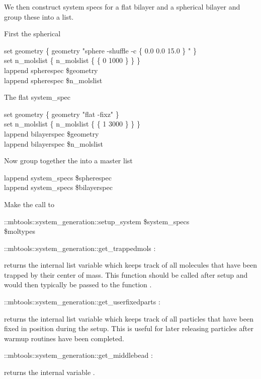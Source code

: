 We then construct system specs for a flat bilayer and a spherical bilayer and group these into a  list.

First the spherical 

\begin{code}      	   
  set geometry \{ geometry  "sphere -shuffle -c \{ 0.0 0.0 15.0 \} " \}\\
  set n_molslist \{ n_molslist \{  \{ 0 1000 \} \} \}\\
  lappend spherespec \$geometry \\
  lappend spherespec \$n_molslist\\
\end{code}      	  

The flat system_spec

\begin{code}     	  
  set geometry \{ geometry "flat -fixz" \}\\
  set n_molslist \{ n_molslist \{  \{ 1 3000 \} \} \}\\
  lappend bilayerspec \$geometry\\
  lappend bilayerspec \$n_molslist\\
\end{code}      	  
      	

Now group together the  into a master list

\begin{code}      	  
  lappend system_specs \$spherespec\\
  lappend system_specs \$bilayerspec\\
\end{code}   	  


Make the call to 

\begin{code}
  ::mbtools::system_generation::setup_system \$system_specs\\
           [setmd box_l] \$moltypes
\end{code}


\begin{code}
  ::mbtools::system_generation::get_trappedmols : 
\end{code}
returns the internal list variable  which keeps track of all molecules that have been trapped by their center of mass. This function should be called after setup and would then typically be passed to the function .
\begin{code}
  ::mbtools::system_generation::get_userfixedparts : 
\end{code}
returns the internal list variable  which keeps track of all particles that have been fixed in position during the setup. This is useful for later releasing particles after warmup routines have been completed.
\begin{code}
  ::mbtools::system_generation::get_middlebead : 
\end{code}
returns the internal variable .

